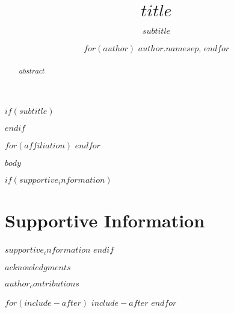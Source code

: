 \documentclass[$class_option$]{stjour}
\begin{document}
\title[$short_title$]{$title$}
$if(subtitle)$
\subtitle{$subtitle$}
$endif$

\author[$short_author$]{
  $for(author)$
    $author.name$$sep$,
  $endfor$
}

$for(affiliation)$
$endfor$



\begin{abstract}
$abstract$
\end{abstract}

$body$


$if(supportive_information)$
  \section{Supportive Information}
  $supportive_information$
$endif$

\acknowledgments
$acknowledgments$

\authorcontributions
$author_contributions$



\clearpage

$for(include-after)$
  $include-after$
$endfor$
\end{document}
